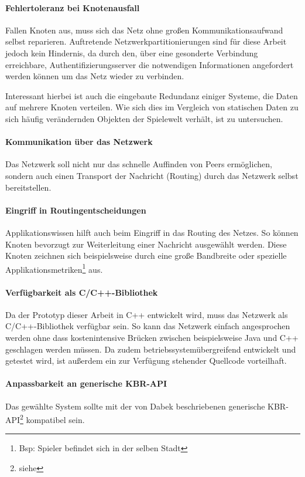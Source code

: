 \paragraph{Fehlertoleranz bei Knotenausfall} Fallen Knoten aus, muss sich das Netz ohne großen Kommunikationsaufwand selbst reparieren. Auftretende Netzwerkpartitionierungen sind für diese Arbeit jedoch kein Hindernis, da durch den, über eine gesonderte Verbindung erreichbare, Authentifizierungsserver die notwendigen Informationen angefordert werden können um das Netz wieder zu verbinden.

Interessant hierbei ist auch die eingebaute Redundanz einiger Systeme, die Daten auf mehrere Knoten verteilen. Wie sich dies im Vergleich von statischen Daten zu sich häufig verändernden Objekten der Spielewelt verhält, ist zu untersuchen. 

\paragraph{Kommunikation über das Netzwerk} Das Netzwerk soll nicht nur das schnelle Auffinden von Peers ermöglichen, sondern auch einen Transport der Nachricht (Routing) durch das Netzwerk selbst bereitstellen.

\paragraph{Eingriff in Routingentscheidungen} Applikationswissen hilft auch beim Eingriff in das Routing des Netzes. So können Knoten bevorzugt zur Weiterleitung einer Nachricht ausgewählt werden. Diese Knoten zeichnen sich beispielsweise durch eine große Bandbreite oder spezielle Applikationsmetriken\footnote{Bsp: Spieler befindet sich in der selben Stadt} aus.

\paragraph{Verfügbarkeit als C/C++-Bibliothek} Da der Prototyp dieser Arbeit in C++ entwickelt wird, muss das Netzwerk als C/C++-Bibliothek verfügbar sein. So kann das Netzwerk einfach angesprochen werden ohne dass kostenintensive Brücken zwischen beispielsweise Java und C++ geschlagen werden müssen. Da zudem betriebssystemübergreifend entwickelt und getestet wird, ist außerdem ein zur Verfügung stehender Quellcode vorteilhaft.

\paragraph{Anpassbarkeit an generische KBR-API}
Das gewählte System sollte mit der von Dabek beschriebenen generische KBR-API\footnote{siehe } kompatibel sein.

